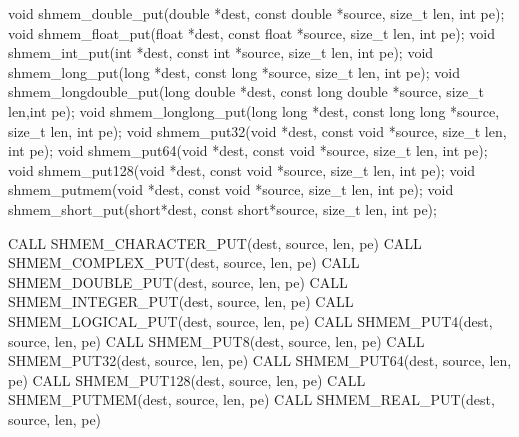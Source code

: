 \synC   %

void shmem_double_put(double *dest, const double *source, size_t len, int pe);
void shmem_float_put(float *dest, const float *source, size_t len, int pe);
void shmem_int_put(int *dest, const int *source, size_t len, int pe);
void shmem_long_put(long *dest, const long *source, size_t len, int pe);
void shmem_longdouble_put(long double *dest, const long double *source, size_t len,int pe);
void shmem_longlong_put(long long *dest, const long long *source, size_t len, int pe);
void shmem_put32(void *dest, const void *source, size_t len, int pe);
void shmem_put64(void *dest, const void *source, size_t len, int pe);
void shmem_put128(void *dest, const void *source, size_t len, int pe);
void shmem_putmem(void *dest, const void *source, size_t len, int pe);
void shmem_short_put(short*dest, const short*source, size_t len, int pe); %

\synF   %

CALL SHMEM_CHARACTER_PUT(dest, source, len, pe)
CALL SHMEM_COMPLEX_PUT(dest, source, len, pe)
CALL SHMEM_DOUBLE_PUT(dest, source, len, pe)
CALL SHMEM_INTEGER_PUT(dest, source, len, pe)
CALL SHMEM_LOGICAL_PUT(dest, source, len, pe)
CALL SHMEM_PUT4(dest, source, len, pe)
CALL SHMEM_PUT8(dest, source, len, pe)
CALL SHMEM_PUT32(dest, source, len, pe)
CALL SHMEM_PUT64(dest, source, len, pe)
CALL SHMEM_PUT128(dest, source, len, pe)
CALL SHMEM_PUTMEM(dest, source, len, pe)
CALL SHMEM_REAL_PUT(dest, source, len, pe) %

